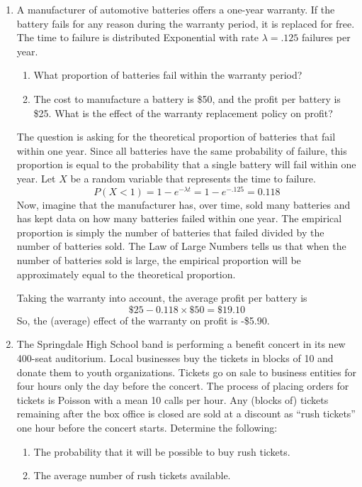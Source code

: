 \begin{enumerate}

\item A manufacturer of automotive batteries offers a one-year
  warranty. If the battery fails for any reason during the warranty
  period, it is replaced for free. The time to failure is distributed
  Exponential with rate $\lambda=.125$ failures per year.
\begin{enumerate}
\item What proportion of batteries fail within the warranty period?
\item The cost to manufacture a battery is \$50, and the profit
per battery is \$25. What is the effect of the warranty replacement
policy on profit? \label{ex:profit}
\end{enumerate}

\begin{solution}
  \bs The question is asking for the theoretical proportion of
  batteries that fail within one year. Since all batteries have the
  same probability of failure, this proportion is equal to the
  probability that a single battery will fail within one year. Let $X$
  be a random variable that represents the time to failure.
\[ P(X<1) = 1-e^{-\lambda t} = 1 - e^{-.125} = 0.118 \]
Now, imagine that the manufacturer has, over time,
  sold many batteries and has kept data on how many batteries failed
  within one year. The empirical proportion is simply the number
  of batteries that failed divided by the number of batteries sold.
  The Law of Large Numbers tells us that when the number of batteries
  sold is large, the empirical proportion will be approximately
  equal to the theoretical proportion.

Taking the warranty into account, the average profit per battery is
\[ \$25 - 0.118\times \$50 = \$19.10 \]
So, the (average) effect of the warranty on profit is -\$5.90.
\end{solution}

\item The Springdale High School band is performing a benefit concert
  in its new 400-seat auditorium. Local businesses buy the tickets in
  blocks of 10 and donate them to youth organizations. Tickets go on
  sale to business entities for four hours only the day before the
  concert. The process of placing orders for tickets is Poisson with a
  mean 10 calls per hour.  Any (blocks of) tickets remaining after the
  box office is closed are sold at a discount as ``rush tickets'' one hour
  before the concert starts. Determine the following:
\begin{enumerate}
\item The probability that it will be possible to buy rush tickets. \label{ex:rusha}
\item  The average number of rush tickets available. \label{ex:rushb}
\end{enumerate}


\end{enumerate}
